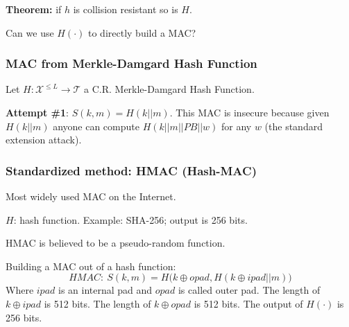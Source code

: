 \documentclass[12pt]{book}
\newcommand{\Thm}{\textbf{Theorem:} }
\begin{document}
\begin{center}
\end{center}
\Thm if $h$ is collision resistant so is $H$.

Can we use $H(\cdot)$ to directly build a MAC?

\subsubsection{MAC from Merkle-Damgard Hash Function}
Let $H:\mathcal{X}^{\leq L}\rightarrow\mathcal{T}$ a C.R. Merkle-Damgard Hash Function.

\textbf{Attempt \#1}: $S(k,m)=H(k||m)$. This MAC is insecure because given $H(k||m)$ anyone can compute $H(k||m||PB||w)$ for any $w$ (the standard extension attack).

\subsubsection{Standardized method: HMAC (Hash-MAC)}
Most widely used MAC on the Internet.

$H$: hash function. Example: SHA-256; output is 256 bits.

HMAC is believed to be a pseudo-random function.

Building a MAC out of a hash function:
$$HMAC:\ S(k,m)=H\big(k\oplus opad,H(k\oplus ipad||m)\big)$$Where $ipad$ is an internal pad and $opad$ is called outer pad. The length of $k\oplus ipad$ is 512 bits. The length of $k\oplus opad$ is 512 bits. The output of $H(\cdot)$ is 256 bits.
\end{document}
